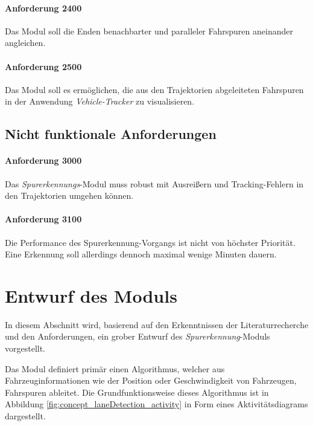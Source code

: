 \paragraph{Anforderung 2400}
Das Modul soll die Enden benachbarter und paralleler Fahrspuren aneinander angleichen.

\paragraph{Anforderung 2500}
Das Modul soll es ermöglichen, die aus den Trajektorien abgeleiteten Fahrspuren in der Anwendung \textit{Vehicle-Tracker}
zu visualisieren.

\subsection{Nicht funktionale Anforderungen}

\paragraph{Anforderung 3000}
Das \textit{Spurerkennungs}-Modul muss robust mit Ausreißern und Tracking-Fehlern in den Trajektorien umgehen können.

\paragraph{Anforderung 3100}
Die Performance des Spurerkennung-Vorgangs ist nicht von höchster Priorität. Eine Erkennung soll allerdings
dennoch maximal wenige Minuten dauern.


\section{Entwurf des Moduls}
\label{sec:design}

In diesem Abschnitt wird, basierend auf den Erkenntnissen der Literaturrecherche und den Anforderungen,
ein grober Entwurf des \textit{Spurerkennung}-Moduls vorgestellt.

Das Modul definiert primär einen Algorithmus, welcher aus Fahrzeuginformationen wie der Position
oder Geschwindigkeit von Fahrzeugen, Fahrspuren ableitet. Die Grundfunktionsweise dieses Algorithmus
ist in Abbildung \ref{fig:concept_laneDetection_activity} in Form eines Aktivitätsdiagrams dargestellt.

